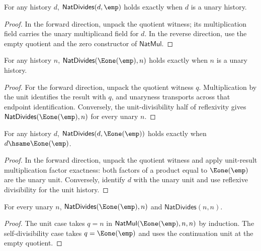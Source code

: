 \begin{lemma}
\label{thm:natdivides-empty-right-iff}
For any history $d$, $\mathsf{NatDivides}(d,\emp)$ holds exactly when $d$ is a
unary history.
\end{lemma}
\begin{proof}
In the forward direction, unpack the quotient witness; its multiplication
field carries the unary multiplicand field for $d$. In the reverse direction,
use the empty quotient and the zero constructor of $\mathsf{NatMul}$.
\end{proof}

\begin{theorem}
\label{thm:natdivides-unit-left-iff}
For any history $n$, $\mathsf{NatDivides}(\Eone(\emp),n)$ holds exactly when
$n$ is a unary history.
\end{theorem}
\begin{proof}
For the forward direction, unpack the quotient witness $q$. Multiplication by
the unit identifies the result with $q$, and unaryness transports across that
endpoint identification. Conversely, the unit-divisibility half of reflexivity
gives $\mathsf{NatDivides}(\Eone(\emp),n)$ for every unary $n$.
\end{proof}

\begin{theorem}
\label{thm:nat-divides-unit-right-iff}
For any history $d$, $\mathsf{NatDivides}(d,\Eone(\emp))$ holds exactly when
$d\hsame\Eone(\emp)$.
\end{theorem}
\begin{proof}
In the forward direction, unpack the quotient witness and apply unit-result
multiplication factor exactness: both factors of a product equal to
\(\Eone(\emp)\) are the unary unit. Conversely, identify \(d\) with the unary
unit and use reflexive divisibility for the unit history.
\end{proof}

\begin{lemma}
\label{lem:divides-reflexive}
For every unary \(n\), \(\mathsf{NatDivides}(\Eone(\emp), n)\) and \(\mathsf{NatDivides}(n, n)\).
\end{lemma}
\begin{proof}
The unit case takes \(q = n\) in \(\mathsf{NatMul}(\Eone(\emp), n, n)\) by induction. The self-divisibility case takes \(q = \Eone(\emp)\) and uses the continuation unit at the empty quotient.
\end{proof}

